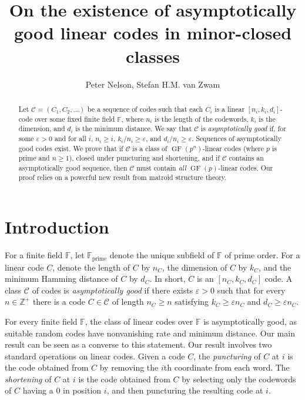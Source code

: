 \documentclass[12pt]{amsart}
\theoremstyle{definition}
\newcommand{\bF}{\mathbb F}
\newcommand{\bZ}{\mathbb Z}
\newcommand{\cC}{\mathcal{C}}
\newcommand{\Fprime}{\mathbb{F}_{\mathrm{prime}}}
\DeclareMathOperator{\GF}{GF}
\begin{document}
\sloppy

\title[Asymptotically Good Codes]{On the existence of asymptotically good linear codes in minor-closed classes}

\author{Peter Nelson, Stefan H.M. van Zwam}

\maketitle

\begin{abstract}
  Let $\mathcal{C} = (C_1, C_2, \ldots)$ be a sequence of codes such that each $C_i$ is a linear $[n_i,k_i,d_i]$-code over some fixed finite field $\bF$, where $n_i$ is the length of the codewords, $k_i$ is the dimension, and $d_i$ is the minimum distance. We say that $\mathcal{C}$ is \emph{asymptotically good} if, for some $\varepsilon > 0$ and for all $i$, $n_i \geq i$, $k_i/n_i \geq \varepsilon$, and $d_i/n_i \geq \varepsilon$. Sequences of asymptotically good codes exist. We prove that if $\mathcal{C}$ is a class of $\GF(p^n)$-linear codes (where $p$ is prime and $n \geq 1$), closed under puncturing and shortening, and if $\mathcal{C}$ contains an asymptotically good sequence, then $\mathcal{C}$ must contain \emph{all} $\GF(p)$-linear codes. Our proof relies on a powerful new result from matroid structure theory.
\end{abstract}

\section{Introduction}

  For a finite field $\bF$, let $\Fprime$ denote the unique subfield of $\bF$ of prime order. For a linear code $C$, denote the length of $C$ by $n_C$, the dimension of $C$ by $k_C$, and the minimum Hamming distance of $C$ by $d_C$. In short, $C$ is an $[n_C, k_C, d_C]$ code. A class $\cC$ of codes is \emph{asymptotically good} if there exists $\varepsilon > 0$ such that for every $n \in \bZ^+$ there is a code $C \in \cC$ of length $n_C \geq n$ satisfying $k_C \ge \varepsilon n_C$ and $d_C \ge \varepsilon n_C$. 
  
  For every finite field $\bF$, the class of linear codes over $\bF$ is asymptotically good, as suitable random codes have nonvanishing rate and minimum distance. Our main result can be seen as a converse to this statement. Our result involves two standard operations on linear codes. Given a code $C$, the \emph{puncturing} of $C$ at $i$ is the code obtained from $C$ by removing the $i$th coordinate from each word. The \emph{shortening} of $C$ at $i$ is the code obtained from $C$ by selecting only the codewords of $C$ having a $0$ in position $i$, and then puncturing the resulting code at $i$.
  
\end{document}
